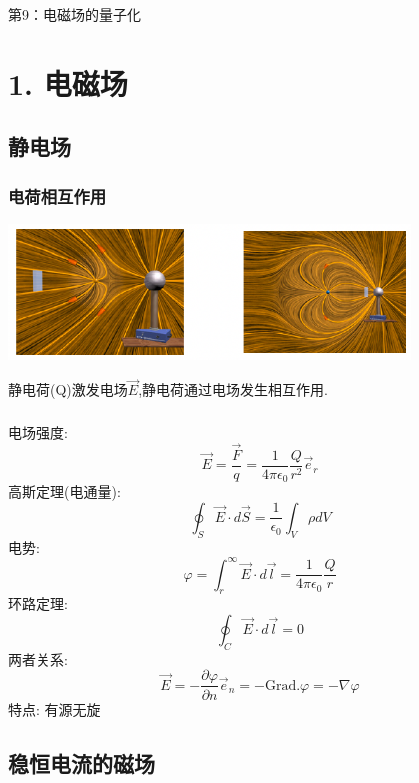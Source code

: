 

\begin{frame} [plain]
    \frametitle{}
    \Background[1] 
    \begin{center}
    {\huge 第9：电磁场的量子化 }
    \end{center}  
    \addtocounter{framenumber}{-1}   
\end{frame}

\section{1. 电磁场}

\subsection{静电场}

\begin{frame}
      \frametitle{电荷相互作用}
        \begin{center}
             \includegraphics[width=0.8\textwidth]{figs/41a.png}
        \end{center}
        静电荷(Q)激发电场$\vec{E}$,静电荷通过电场发生相互作用. 
\end{frame}

\begin{frame}
    \frametitle{}    
    电场强度: \[\vec{E}=\frac{\vec{F}}{q}=\frac{1}{4\pi \epsilon_0}\frac{Q}{r^2}\vec{e}_r\]
    高斯定理(电通量):\[ \oint_S \vec{E}\cdot d \vec{S} = \frac{1}{\epsilon_0}\int_V \rho  d V \]  
    电势: \[ \varphi =\int^\infty_r \vec{E}\cdot d \vec{l} = \frac{1}{4\pi \epsilon_0}\frac{Q}{r}\]
    环路定理: \[ \oint_C \vec{E}\cdot d \vec{l} = 0\]
    两者关系: \[ \vec{E}=-\frac{\partial \varphi}{\partial n} \vec{e}_n=-\mathrm{Grad.} \varphi =-\nabla \varphi\]
    特点: 有源无旋
\end{frame}

\subsection{稳恒电流的磁场}

